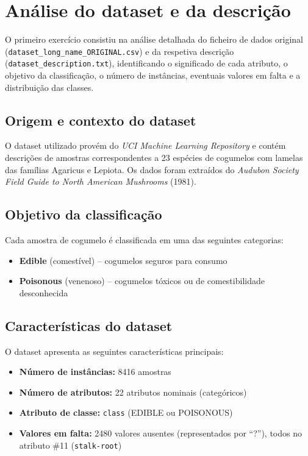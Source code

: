 \documentclass[12pt,a4paper]{article}
\begin{document}
\section{Análise do dataset e da descrição}

O primeiro exercício consistiu na análise detalhada do ficheiro de dados original (\texttt{dataset\_long\_name\_ORIGINAL.csv}) e da respetiva descrição (\texttt{dataset\_description.txt}), identificando o significado de cada atributo, o objetivo da classificação, o número de instâncias, eventuais valores em falta e a distribuição das classes.

\subsection{Origem e contexto do dataset}

O dataset utilizado provém do \textit{UCI Machine Learning Repository} e contém descrições de amostras correspondentes a 23 espécies de cogumelos com lamelas das famílias Agaricus e Lepiota. Os dados foram extraídos do \textit{Audubon Society Field Guide to North American Mushrooms} (1981).

\subsection{Objetivo da classificação}

Cada amostra de cogumelo é classificada em uma das seguintes categorias:
\begin{itemize}
    \item \textbf{Edible} (comestível) -- cogumelos seguros para consumo
    \item \textbf{Poisonous} (venenoso) -- cogumelos tóxicos ou de comestibilidade desconhecida
\end{itemize}

\subsection{Características do dataset}

O dataset apresenta as seguintes características principais:

\begin{itemize}
    \item \textbf{Número de instâncias:} 8416 amostras
    \item \textbf{Número de atributos:} 22 atributos nominais (categóricos)
    \item \textbf{Atributo de classe:} \texttt{class} (EDIBLE ou POISONOUS)
    \item \textbf{Valores em falta:} 2480 valores ausentes (representados por ``?''), todos no atributo \#11 (\texttt{stalk-root})
\end{itemize}
\end{document}
